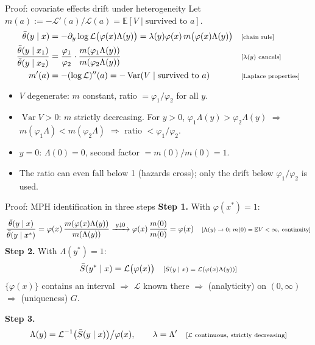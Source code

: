 \documentclass[aspectratio=169,10pt]{beamer}
\newcommand{\E}{\mathbb{E}}
\newcommand{\Lap}{\mathcal{L}}
\newcommand{\var}{\operatorname{Var}}
\newcommand{\why}[1]{\text{\scriptsize[#1]}}
\begin{document}
\begin{frame}[label=p-ratio]{Proof: covariate effects drift under heterogeneity}
  Let $m(a):=-\Lap'(a)/\Lap(a)=\E[V\mid\text{survived to }a]$.
  \begin{align*}
    \bar\theta(y\mid x) &= -\partial_y\log\Lap\big(\varphi(x)\Lambda(y)\big) = \lambda(y)\varphi(x)\,m\big(\varphi(x)\Lambda(y)\big) && \why{chain rule} \\
    \frac{\bar\theta(y\mid x_1)}{\bar\theta(y\mid x_2)} &= \frac{\varphi_1}{\varphi_2}\cdot\frac{m(\varphi_1\Lambda(y))}{m(\varphi_2\Lambda(y))} && \why{$\lambda(y)$ cancels} \\
    m'(a) &= -(\log\Lap)''(a) = -\var(V\mid\text{survived to }a) && \why{Laplace properties}
  \end{align*}
  \begin{itemize}
    \item $V$ degenerate: $m$ constant, ratio $=\varphi_1/\varphi_2$ for all $y$.
    \item $\var V>0$: $m$ strictly decreasing. For $y>0$, $\varphi_1\Lambda(y)>\varphi_2\Lambda(y)$ $\Rightarrow$ $m(\varphi_1\Lambda)<m(\varphi_2\Lambda)$ $\Rightarrow$ ratio $<\varphi_1/\varphi_2$.
    \item $y=0$: $\Lambda(0)=0$, second factor $=m(0)/m(0)=1$.
    \item The ratio can even fall below 1 (hazards cross); only the drift below $\varphi_1/\varphi_2$ is used.
  \end{itemize}
\end{frame}

\begin{frame}[label=p-er]{Proof: MPH identification in three steps}
  \textbf{Step 1.} With $\varphi(x^*)=1$:
  \begin{align*}
    \frac{\bar\theta(y\mid x)}{\bar\theta(y\mid x^*)} = \varphi(x)\,\frac{m(\varphi(x)\Lambda(y))}{m(\Lambda(y))} \xrightarrow{\;y\downarrow0\;} \varphi(x)\,\frac{m(0)}{m(0)}=\varphi(x) && \why{$\Lambda(y)\to0$; $m(0)=\E V<\infty$, continuity}
  \end{align*}
  \textbf{Step 2.} With $\Lambda(y^*)=1$:
  \begin{align*}
    \bar S(y^*\mid x) = \Lap\big(\varphi(x)\big) && \why{$\bar S(y\mid x)=\Lap(\varphi(x)\Lambda(y))$}
  \end{align*}
  $\{\varphi(x)\}$ contains an interval $\Rightarrow$ $\Lap$ known there $\Rightarrow$ (analyticity) on $(0,\infty)$ $\Rightarrow$ (uniqueness) $G$.

  \textbf{Step 3.}
  \begin{align*}
    \Lambda(y) = \Lap^{-1}\big(\bar S(y\mid x)\big)\big/\varphi(x), \qquad \lambda=\Lambda' && \why{$\Lap$ continuous, strictly decreasing}
  \end{align*}
\end{frame}
\end{document}

